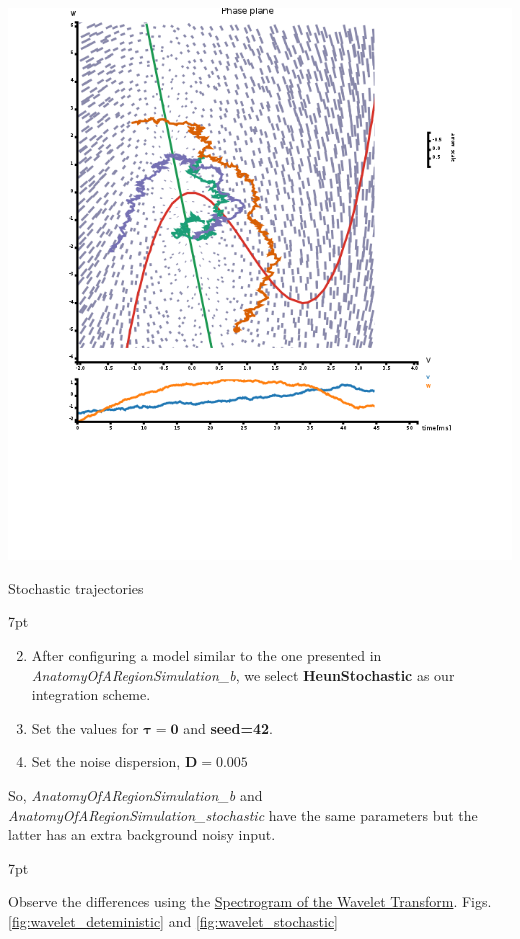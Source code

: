 \documentclass{tufte-handout}
\newenvironment{formal}{%
  \def\FrameCommand{%
    \hspace{1pt}%
    {\color{DarkBlue}\vrule width 2pt}%
    {\color{formalshade}\vrule width 4pt}%
    \colorbox{formalshade}%
  }%
  \MakeFramed{\advance\hsize-\width\FrameRestore}%
  \noindent\hspace{-4.55pt}%
  \begin{adjustwidth}{}{7pt}%
  \vspace{2pt}\vspace{2pt}%
}
{%
  \vspace{2pt}\end{adjustwidth}\endMakeFramed%
}
\newenvironment{simulation}{%
  \def\FrameCommand{%
    \hspace{1pt}%
    {\color{ForestGreen}\vrule width 2pt}%
    {\color{simulationshade}\vrule width 4pt}%
    \colorbox{simulationshade}%
  }%
  \MakeFramed{\advance\hsize-\width\FrameRestore}%
  \noindent\hspace{-4.55pt}%
  \begin{adjustwidth}{}{7pt}%
  \vspace{2pt}\vspace{2pt}%
}
{%
  \vspace{2pt}\end{adjustwidth}\endMakeFramed%
}
\begin{document}
\begin{marginfigure}%
\includegraphics[width=\linewidth]{Handout_UI_BrainNetworkModelsAtRest_PPI_Stochastic}%
  \caption{Stochastic trajectories}%
  \label{fig:ppi_noise}%
\end{marginfigure}

\begin{simulation}
\begin{enumerate}[resume]
\setcounter{enumi}{1}
\item After configuring a model similar to the one presented in  \textit{AnatomyOfARegionSimulation\_b}, we select \textbf{HeunStochastic} as our integration scheme.  
\item Set the values for {$\boldsymbol{\tau=0}$}  and \textbf{seed=42}. 
\item Set the noise dispersion, $\mathbf{D=0.005}$
\end{enumerate}
\end{simulation}
So, \textit{AnatomyOfARegionSimulation\_b} and \textit{AnatomyOfARegionSimulation\_stochastic} have the same parameters but the latter has an extra background noisy input. 

\begin{formal}
\begin{enumerate}
Observe the differences using the \underline{Spectrogram of the Wavelet Transform}. Figs. \ref{fig:wavelet_deteministic} and \ref{fig:wavelet_stochastic}
\end{enumerate}
\end{formal}
\end{document}
